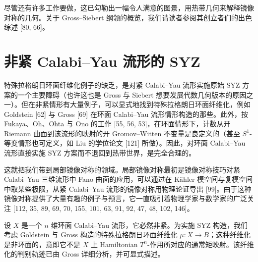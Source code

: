 尽管还有许多工作要做，这已勾勒出一幅令人满意的图景，用热带几何来解释镜像对称的几何。关于 Gross--Siebert 纲领的概览，我们请读者参阅其创立者们的出色综述 [80, 66]。

\section{非紧 Calabi--Yau 流形的 SYZ}
特殊拉格朗日环面纤维化例子的缺乏，是对紧 Calabi--Yau 流形实施原始 SYZ 方案的一个主要障碍（也许这也是 Gross 与 Siebert 想要发展代数几何版本的原因之一）。但在非紧情形有大量例子，可以显式地找到特殊拉格朗日环面纤维化，例如 Goldstein [62] 与 Gross [69] 在环面 Calabi--Yau 流形情形构造的那些。此外，按 Fukaya、Oh、Ohta 与 Ono 的工作 [55, 56, 53]，在环面情形下，计数从开 Riemann 曲面到该流形的映射的开 Gromov--Witten 不变量是良定义的（甚至 $S^1$-等变情形也可定义，如 Liu 的学位论文 [121] 所做）。因此，对环面 Calabi--Yau 流形直接实施 SYZ 方案而不退回到热带世界，是完全合理的。

这就把我们带到局部镜像对称的领域。局部镜像对称最初是镜像对称技巧对紧 Calabi--Yau 三维流形中 Fano 曲面的应用，可以通过在 K\"ahler 模空间与复模空间中取某些极限，从紧 Calabi--Yau 流形的镜像对称用物理论证导出 [99]。由于这种镜像对称提供了大量有趣的例子与预言，它一直吸引着物理学家与数学家的广泛关注 [112, 35, 89, 69, 70, 155, 101, 63, 91, 92, 47, 48, 102, 146]。

设 $X$ 是一个 $n$ 维环面 Calabi--Yau 流形，它必然非紧。为实施 SYZ 构造，我们考虑 Goldstein 与 Gross 构造的特殊拉格朗日环面纤维化 $\mu : X \to B$；这种纤维化是非环面的，意即它不是 $X$ 上 Hamiltonian $T^n$-作用所对应的通常矩映射。该纤维化的判别轨迹已由 Gross 详细分析，并可显式描述。
